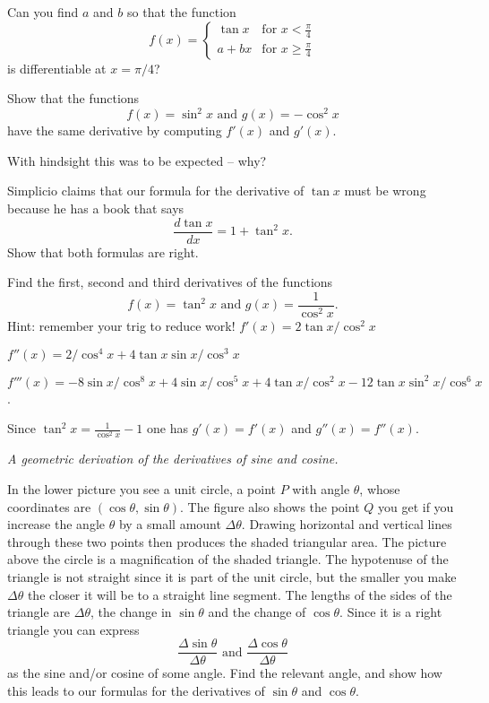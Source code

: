 \begin{multicols}{2}
\problem Can you find $a$ and $b$ so that the function 
\[
f(x) = \begin{cases}
  \tan x & \text{for $x< \frac\pi4$} \\
  a+bx   & \text{for $x\geq\frac\pi4$}
\end{cases}
\]
is differentiable at $x=\pi/4$?




\problem  Show that the functions 
\[
f(x) = \sin^2 x \text{ and } g(x) = -\cos^2x
\]
have the same derivative by computing $f'(x)$ and $g'(x)$.




With hindsight this was to be expected -- why?




\problem Simplicio claims that our formula for the derivative of $\tan x$ must 
be wrong because he has a book that says
\[
\frac{d\tan x} {dx} = 1+\tan^2 x.
\]
Show that both formulas are right.




\problem Find the first, second and third derivatives of the functions 
\[
f(x) = \tan^2 x \text{ and }
g(x) = \frac{1}{\cos^2 x}.
\]
Hint: remember your trig to reduce work!
\answer 
$f'(x) = 2\tan x/\cos^2 x$




$f''(x) = 2/\cos^4 x + 4\tan x \sin x/\cos^3 x$




$f'''(x) = -8\sin x/\cos^8 x + 4\sin x/\cos^5 x
           + 4\tan x/\cos^2x - 12\tan x \sin^2x/\cos^6x$.




Since $\tan^2 x= \frac{1}{\cos^2 x}-1$ one has $g'(x) = f'(x)$ and
$g''(x) = f''(x)$.
\endanswer




\problem \textit{A geometric derivation of the derivatives of sine and cosine.} 




\centerline{}




In the lower picture you see a unit circle, a point $P$ with angle $ \theta $, whose
coordinates are $(\cos \theta, \sin \theta)$.  The figure also shows the point $Q$
you get if you increase the angle $\theta$ by a small amount
$\Delta\theta$. Drawing horizontal and vertical lines through these two points
then produces the shaded triangular area.  The picture above the circle is a
magnification of the shaded triangle.  The hypotenuse of the triangle is not
straight since it is part of the unit circle, but the smaller you make
$\Delta\theta$ the closer it will be to a straight line segment.  The lengths of
the sides of the triangle are $\Delta\theta$, the change in $\sin\theta$ and the
change of $\cos \theta$.  Since it is a right triangle you can express
\[
\frac{\Delta\sin \theta} {\Delta\theta} \text{ and }
\frac{\Delta\cos\theta} {\Delta\theta}
\]
as the sine and/or cosine of some angle.  Find the relevant angle, and show how this
leads to our formulas for the derivatives of $\sin\theta$ and $\cos\theta$.





\end{multicols}
